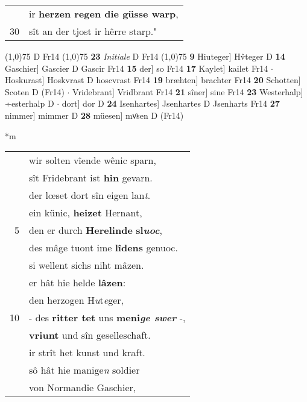 \documentclass[8pt,a4paper,notitlepage]{article}
\begin{document}
\begin{table}[ht]
\begin{minipage}[t]{0.5\linewidth}
\begin{tabular}{rl}
 & ir \textbf{herzen regen die güsse warp},\\ 
30 & sît an der tjost ir hêrre starp."\\ 
\end{tabular}
\scriptsize
\line(1,0){75} \newline
D Fr14 \newline
\line(1,0){75} \newline
\textbf{23} \textit{Initiale} D Fr14  \newline
\line(1,0){75} \newline
\textbf{9} Hiuteger] Hv̂teger D \textbf{14} Gaschier] Gascier D Gascir Fr14 \textbf{15} der] so Fr14 \textbf{17} Kaylet] kailet Fr14  $\cdot$ Hoskurast] Hoskvrast D hoscvrast Fr14 \textbf{19} bræhten] brachter Fr14 \textbf{20} Schotten] Scoten D (Fr14)  $\cdot$ Vridebrant] Vridbrant Fr14 \textbf{21} sîner] sine Fr14 \textbf{23} Westerhalp] ÷esterhalp D  $\cdot$ dort] dor D \textbf{24} Isenhartes] Jsenhartes D Jsenharts Fr14 \textbf{27} nimmer] mimmer D \textbf{28} müesen] mvͦsen D (Fr14) \newline
\end{minipage}
\hspace{0.5cm}
\begin{minipage}[t]{0.5\linewidth}
\small
\begin{center}*m
\end{center}
\begin{tabular}{rl}
 & wir solten vîende wênic sparn,\\ 
 & sît Fridebrant ist \textbf{hin} gevarn.\\ 
 & der lœset dort sîn eigen lan\textit{t}.\\ 
 & ein künic, \textbf{heizet} Hernant,\\ 
5 & den er durch \textbf{Herelinde} \textbf{sl\textit{uoc}},\\ 
 & des mâge tuont ime \textbf{lîdens} genuoc.\\ 
 & si wellent sichs niht mâzen.\\ 
 & er hât hie helde \textbf{lâzen}:\\ 
 & den herzogen H\textit{u}t\textit{e}ger,\\ 
10 & - des \textbf{ritter tet} uns \textbf{meni\textit{ge swer}} -,\\ 
 & \textbf{vriunt} und sîn geselleschaft.\\ 
 & ir strît het kunst und kraft.\\ 
 & sô hât hie manige\textit{n} soldier\\ 
 & von Normandie Gaschier,\\ 

\end{tabular}
\end{minipage}
\end{table}
\end{document}
